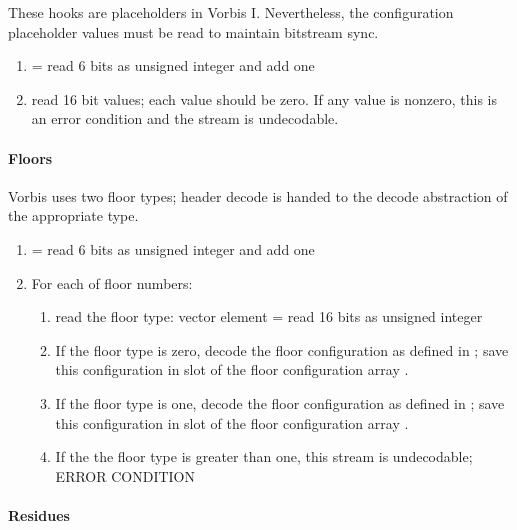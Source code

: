 These hooks are placeholders in Vorbis I.  Nevertheless, the
configuration placeholder values must be read to maintain bitstream
sync.

\begin{enumerate}
\item {} = read 6 bits as unsigned integer and add one
\item read  16 bit values; each value should be zero.  If any value is nonzero, this is an error condition and the stream is undecodable.
\end{enumerate}



\paragraph{Floors}

Vorbis uses two floor types; header decode is handed to the decode
abstraction of the appropriate type.

\begin{enumerate}
 \item {} = read 6 bits as unsigned integer and add one
 \item For each \varname{[i]} of  floor numbers:
  \begin{enumerate}
   \item read the floor type: vector  element \varname{[i]} =
read 16 bits as unsigned integer
   \item If the floor type is zero, decode the floor
configuration as defined in ; save
this
configuration in slot \varname{[i]} of the floor configuration array .
   \item If the floor type is one,
decode the floor configuration as defined in ; save this configuration in slot \varname{[i]} of the floor configuration array .
   \item If the the floor type is greater than one, this stream is undecodable; ERROR CONDITION
  \end{enumerate}

\end{enumerate}



\paragraph{Residues}

